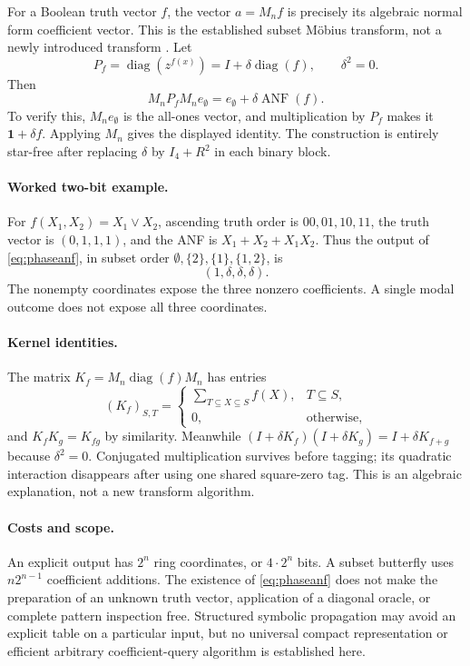 \documentclass[11pt,a4paper]{article}
\theoremstyle{definition}\newtheorem{definition}[theorem]{Definition}
\theoremstyle{remark}\newtheorem{remark}[theorem]{Remark}
\newcommand{\diag}{\operatorname{diag}}
\newcommand{\ANF}{\operatorname{ANF}}
\numberwithin{equation}{section}
\begin{document}
For a Boolean truth vector $f$, the vector $a=M_nf$ is precisely its algebraic normal form coefficient vector. This is the established subset M\"obius transform, not a newly introduced transform \cite{Barbier}. Let
\[
 P_f=\diag(z^{f(x)})=I+\delta\diag(f),\qquad \delta^2=0.
\]
Then
\begin{equation}\label{eq:phaseanf}
 M_nP_fM_ne_\emptyset=e_\emptyset+\delta\ANF(f).
\end{equation}
To verify this, $M_ne_\emptyset$ is the all-ones vector, and multiplication by $P_f$ makes it $\mathbf1+\delta f$. Applying $M_n$ gives the displayed identity. The construction is entirely star-free after replacing $\delta$ by $I_4+R^2$ in each binary block.

\paragraph{Worked two-bit example.}
For $f(X_1,X_2)=X_1\lor X_2$, ascending truth order is $00,01,10,11$, the truth vector is $(0,1,1,1)$, and the ANF is $X_1+X_2+X_1X_2$. Thus the output of \eqref{eq:phaseanf}, in subset order $\emptyset,\{2\},\{1\},\{1,2\}$, is
\[
 (1,\delta,\delta,\delta).
\]
The nonempty coordinates expose the three nonzero coefficients. A single modal outcome does not expose all three coordinates.

\paragraph{Kernel identities.}
The matrix $K_f=M_n\diag(f)M_n$ has entries
\[
 (K_f)_{S,T}=\begin{cases}\sum_{T\subseteq X\subseteq S}f(X),&T\subseteq S,\\0,&\text{otherwise},\end{cases}
\]
and $K_fK_g=K_{fg}$ by similarity. Meanwhile
$(I+\delta K_f)(I+\delta K_g)=I+\delta K_{f+g}$ because $\delta^2=0$. Conjugated multiplication survives before tagging; its quadratic interaction disappears after using one shared square-zero tag. This is an algebraic explanation, not a new transform algorithm.

\paragraph{Costs and scope.}
An explicit output has $2^n$ ring coordinates, or $4\cdot2^n$ bits. A subset butterfly uses $n2^{n-1}$ coefficient additions. The existence of \eqref{eq:phaseanf} does not make the preparation of an unknown truth vector, application of a diagonal oracle, or complete pattern inspection free. Structured symbolic propagation may avoid an explicit table on a particular input, but no universal compact representation or efficient arbitrary coefficient-query algorithm is established here.
\end{document}
